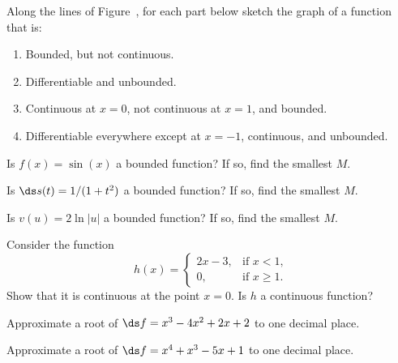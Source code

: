 \begin{exercises}

\begin{exercise} Along the lines of Figure~,
for each part below sketch the
 graph of a function that is:

\begin{enumerate}

  \item Bounded, but not continuous.

  \item Differentiable and unbounded.

  \item Continuous at $x=0$, not continuous at $x=1$, and bounded.
  
  \item Differentiable everywhere except at $x=-1$, continuous, and unbounded.

 \end{enumerate}
\end{exercise}

\begin{exercise} Is $f(x)=\sin(x)$ a bounded function?  If so, find the smallest $M$.
\end{exercise}

\begin{exercise} Is $\ds s(t) = 1/(1+t^2)$ a bounded function?  If so, find the
smallest $M$.
\end{exercise}

 \begin{exercise} Is $v(u) = 2\ln|u|$ a bounded function?  If so, find the smallest $M$.
\end{exercise}

 \begin{exercise} Consider the function 
$$h(x) = \begin{cases}
2x - 3, & \mbox{if $x<1$,} \\
0, & \mbox{if $x\geq 1$.}
\end{cases}$$
Show that it is continuous at the point $x=0$.  Is $h$ a continuous function?
\end{exercise}

\begin{exercise}
Approximate a root of $\ds f=x^3-4x^2+2x+2$ to one decimal place.
\end{exercise}

\begin{exercise}
Approximate a root of $\ds f=x^4+x^3-5x+1$ to one decimal place.
\end{exercise}

\end{exercises}



